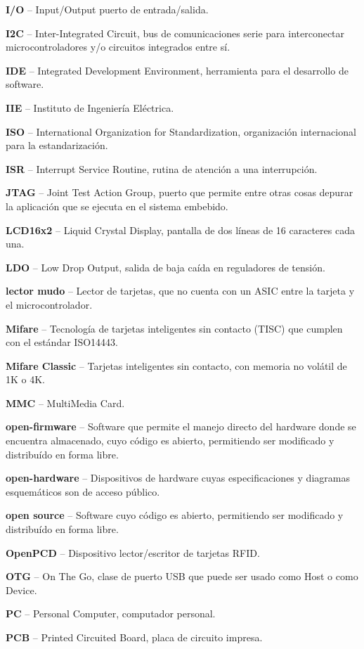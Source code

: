 \begin{glosario}
{\bf{I/O}} – Input/Output puerto de entrada/salida.

{\bf{I2C}} – Inter-Integrated Circuit, bus de comunicaciones serie para interconectar microcontroladores y/o circuitos integrados entre sí.

{\bf{IDE}} – Integrated Development Environment, herramienta para el desarrollo de software.

{\bf{IIE}} – Instituto de Ingeniería Eléctrica.

{\bf{ISO}} – International Organization for Standardization, organización internacional para la estandarización.

{\bf{ISR}} – Interrupt Service Routine, rutina de atención a una interrupción.

{\bf{JTAG}} – Joint Test Action Group, puerto que permite entre otras cosas depurar la aplicación que se ejecuta en el sistema embebido.

{\bf{LCD16x2}} – Liquid Crystal Display, pantalla de dos líneas de 16 caracteres cada una.

{\bf{LDO}} – Low Drop Output, salida de baja caída en reguladores de tensión.

{\bf{lector mudo}} – Lector de tarjetas, que no cuenta con un ASIC entre la tarjeta y el microcontrolador.

{\bf{Mifare}} – Tecnología de tarjetas inteligentes sin contacto (TISC) que cumplen con el estándar ISO14443.

{\bf{Mifare Classic}} – Tarjetas inteligentes sin contacto, con memoria no volátil de 1K o 4K.

{\bf{MMC}} – MultiMedia Card.

{\bf{open-firmware}} – Software que permite el manejo directo del hardware donde se encuentra almacenado, cuyo código es abierto, permitiendo ser modificado y distribuído en forma libre.

{\bf{open-hardware}} – Dispositivos de hardware cuyas especificaciones y diagramas esquemáticos son de acceso público.

{\bf{open source}} – Software cuyo código es abierto, permitiendo ser modificado y distribuído en forma libre.

{\bf{OpenPCD}} – Dispositivo lector/escritor de tarjetas RFID.

{\bf{OTG}} – On The Go, clase de puerto USB que puede ser usado como Host o como Device.

{\bf{PC}} – Personal Computer, computador personal.

{\bf{PCB}} – Printed Circuited Board, placa de circuito impresa.


\end{glosario}
